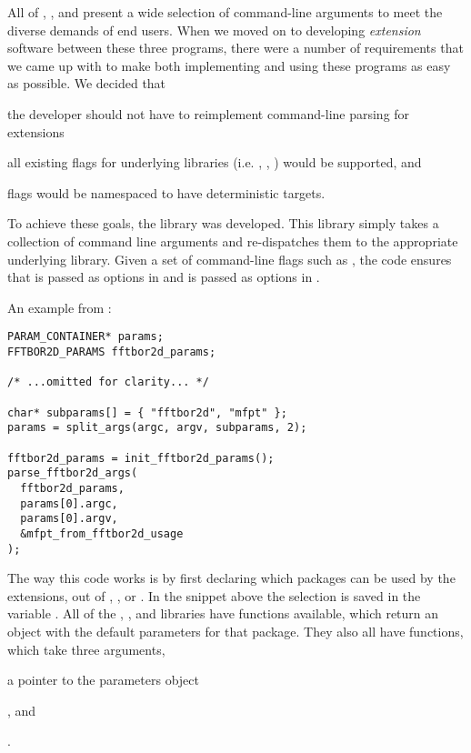 \documentclass[11pt]{article}
\begin{document}

All of \fft, \rnamfpt, and \rnaeq present a wide selection of command-line arguments to meet the diverse demands of end users. When we moved on to developing {\em extension} software between these three programs, there were a number of requirements that we came up with to make both implementing and using these programs as easy as possible. We decided that
\begin{inparaenum}
  \item the developer should not have to reimplement command-line parsing for extensions
  \item all existing flags for underlying libraries (i.e. \fft, \rnamfpt, \rnaeq) would be supported, and
  \item flags would be namespaced to have deterministic targets.
\end{inparaenum}

To achieve these goals, the library \multiParam was developed. This library simply takes a collection of command line arguments and re-dispatches them to the appropriate underlying library. Given a set of command-line flags such as , the code ensures that \fft is passed  as options in  and \rnamfpt is passed  as options in .


An example from :
\begin{verbatim}
PARAM_CONTAINER* params;
FFTBOR2D_PARAMS fftbor2d_params;

/* ...omitted for clarity... */

char* subparams[] = { "fftbor2d", "mfpt" };
params = split_args(argc, argv, subparams, 2);

fftbor2d_params = init_fftbor2d_params();
parse_fftbor2d_args(
  fftbor2d_params,
  params[0].argc,
  params[0].argv,
  &mfpt_from_fftbor2d_usage
);
\end{verbatim}

The way this code works is by first declaring which packages can be used by the extensions, out of , , or . In the snippet above the selection is saved in the variable . All of the \fft, \rnamfpt, and \rnaeq libraries have  functions available, which return an object with the default parameters for that package. They also all have  functions, which take three arguments,
\begin{inparaenum}
  [\itshape 1\upshape)]
  \item a pointer to the parameters object
  \item {}, and
  \item {}
\end{inparaenum}
.
\end{document}

